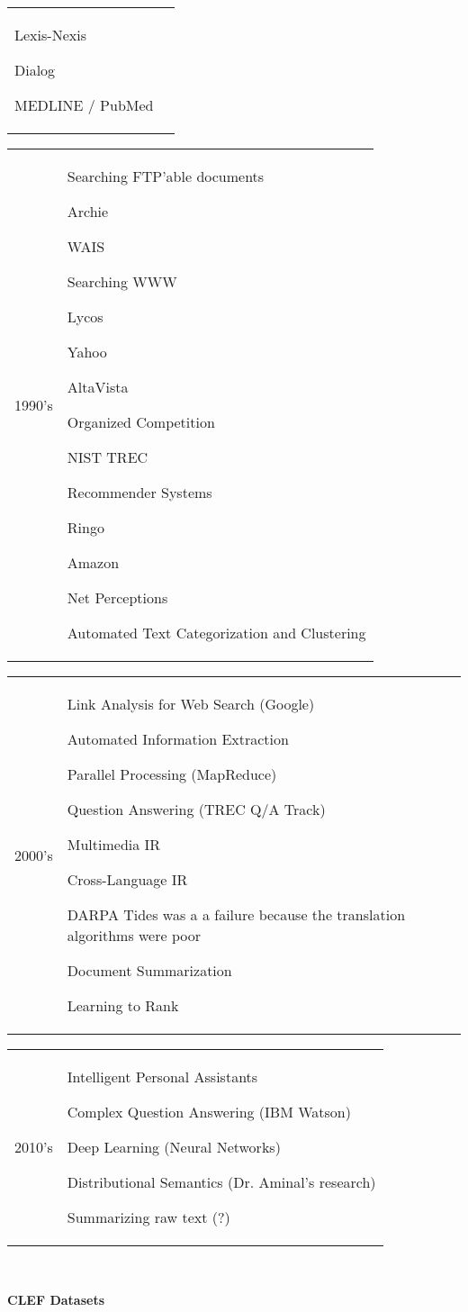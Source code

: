 \documentclass[11pt]{article}
\begin{document}
\begin{spacing}{1.2}
\begin{tabular}{p{3cm}p{15cm}}
	\qquad Lexis-Nexis
	
	\qquad Dialog
	
	\qquad MEDLINE / PubMed
	\cr
\end{tabular}
\begin{tabular}{p{3cm}p{15cm}}
1990's &
	Searching FTP'able documents
	
	\qquad Archie
	
	\qquad WAIS
	
	Searching WWW
	
	\qquad Lycos
	
	\qquad Yahoo
	
	\qquad AltaVista
	
	Organized Competition
	
	\qquad NIST TREC
	
	Recommender Systems
	
	\qquad Ringo
	
	\qquad Amazon
	
	\qquad Net Perceptions
	
	Automated Text Categorization and Clustering	
	\cr
\end{tabular}
\begin{tabular}{p{3cm}p{15cm}}
2000's &
	Link Analysis for Web Search (Google)
	
	Automated Information Extraction
	
	Parallel Processing (MapReduce)
	
	Question Answering (TREC Q/A Track)
	
	Multimedia IR
	
	Cross-Language IR
	
	\qquad DARPA Tides was a a failure because the translation algorithms were poor
	
	Document Summarization
	
	Learning to Rank
	\cr
\end{tabular}
\begin{tabular}{p{3cm}p{15cm}}
2010's &
	Intelligent Personal Assistants
	
	Complex Question Answering (IBM Watson)
	
	Deep Learning (Neural Networks)

	Distributional Semantics (Dr. Aminal's research)
	
	\qquad Summarizing raw text (?)
	
\end{tabular}

\

{\bf CLEF Datasets}


\end{spacing}
\end{document}

